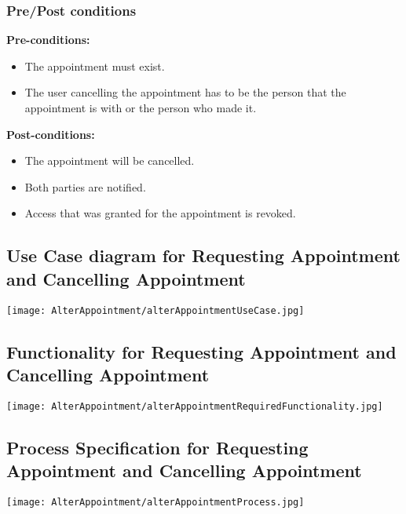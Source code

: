 \subsubsection{Pre/Post conditions}
\textbf{Pre-conditions:} 
	\begin{itemize}
		\item The appointment must exist.
		\item The user cancelling the appointment has to be the person that the appointment is with or the person who made it.
	\end{itemize}
\textbf{Post-conditions:} 
	\begin{itemize}
		\item The appointment will be cancelled.
		\item  Both parties are notified.
		\item Access that was granted for the appointment is revoked. 
	\end{itemize}

\subsection{Use Case diagram for Requesting Appointment and Cancelling Appointment}
	\texttt{[image: AlterAppointment/alterAppointmentUseCase.jpg]}
	
\subsection{Functionality for Requesting Appointment and Cancelling Appointment}
	\texttt{[image: AlterAppointment/alterAppointmentRequiredFunctionality.jpg]}
	
\subsection{Process Specification for Requesting Appointment and Cancelling Appointment}
	\texttt{[image: AlterAppointment/alterAppointmentProcess.jpg]}

